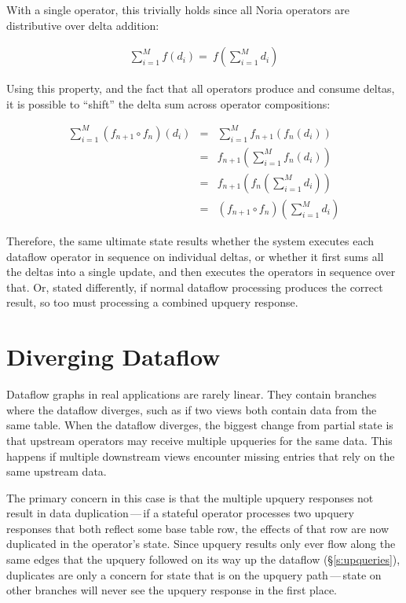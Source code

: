 With a single operator, this trivially holds since all Noria operators are
distributive over delta addition:

\begin{eqnarray*}
  \sum^M_{i=1}f\left(d_i\right) = \
  f\left(\sum^M_{i=1}d_i\right)
\end{eqnarray*}

Using this property, and the fact that all operators produce and consume deltas,
it is possible to ``shift'' the delta sum across operator compositions:

\begin{eqnarray*}
  \sum^M_{i=1}\left(f_{n+1} \circ f_n\right)\left(d_i\right) &=& \sum^M_{i=1}f_{n+1}\left(f_n\left(d_i\right)\right) \\
  &=& f_{n+1}\left(\sum^M_{i=1}f_n\left(d_i\right)\right) \\
  &=& f_{n+1}\left(f_n\left(\sum^M_{i=1}d_i\right)\right) \\
  &=& \left(f_{n+1} \circ f_n\right)\left(\sum^M_{i=1}d_i\right)
\end{eqnarray*}

Therefore, the same ultimate state results whether the system executes each
dataflow operator in sequence on individual deltas, or whether it first sums
all the deltas into a single update, and then executes the operators in sequence
over that. Or, stated differently, if normal dataflow processing produces the
correct result, so too must processing a combined upquery response.

\section{Diverging Dataflow}

Dataflow graphs in real applications are rarely linear. They contain branches
where the dataflow diverges, such as if two views both contain data from the
same table. When the dataflow diverges, the biggest change from partial state is
that upstream operators may receive multiple upqueries for the same data. This
happens if multiple downstream views encounter missing entries that rely on the
same upstream data.

The primary concern in this case is that the multiple upquery responses not
result in data duplication\,---\,if a stateful operator processes two upquery
responses that both reflect some base table row, the effects of that row are now
duplicated in the operator's state. Since upquery results only ever flow along
the same edges that the upquery followed on its way up the dataflow
(\S\ref{s:upqueries}), duplicates are only a concern for state that is on the
upquery path\,---\,state on other branches will never see the upquery response
in the first place.

